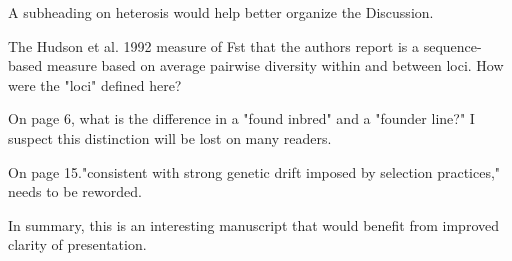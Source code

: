 \documentclass[onecolumn,oneside,letterpaper]{article}
\begin{document}

A subheading on heterosis would help better organize the Discussion.


The Hudson et al. 1992 measure of Fst that the authors report is a sequence-based measure based on 
average pairwise diversity within and between loci. How were the "loci" defined here?


On page 6, what is the difference in a "found inbred" and a "founder line?" I suspect this distinction will 
be lost on many readers.


On page 15."consistent with strong genetic drift imposed by selection practices," needs to be reworded.


In summary, this is an interesting manuscript that would benefit from improved clarity of presentation.




\end{document}
